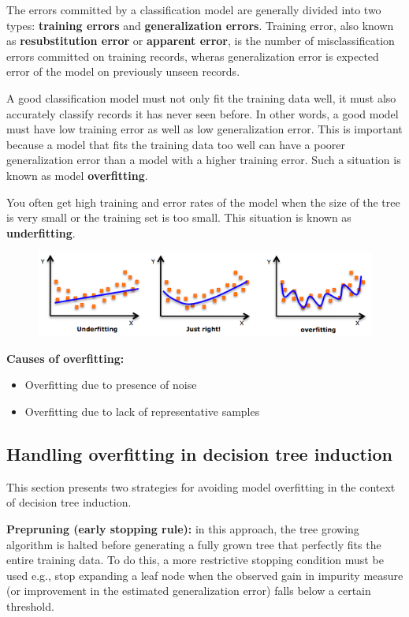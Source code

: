 		The errors committed by a classification model are generally divided into
		two types: {\bf training errors} and {\bf generalization errors}.
		Training error, also known as {\bf resubstitution error} or {\bf apparent error}, 
		is the number of misclassification errors committed on training records, wheras
		generalization error is expected error of the model on previously unseen records. 

		A good classification model must not only fit the training data well, it must
		also accurately classify records it has never seen before. In other words, 
		a good model must have low training error as well as low generalization error. 
		This is important because a model that fits the training data too well can 
		have a poorer generalization error than a model with a higher training error.
		Such a situation is known as model {\bf overfitting}.

		You often get high training and error rates of the model when the size of the
		tree is very small or the training set is too small. This situation is known 
		as {\bf underfitting}.

		\begin{figure}[H]
			\centering
			\includegraphics[width=\textwidth]{pics/fitting.png}
		\end{figure}

		{\bf Causes of overfitting:}
		\begin{itemize}
			\item Overfitting due to presence of noise
			\item Overfitting due to lack of representative samples
		\end{itemize}

		\subsection{Handling overfitting in decision tree induction}

		This section presents two strategies for avoiding model overfitting 
		in the context of decision tree induction. 

		{\bf Prepruning (early stopping rule):} in this approach, the tree growing
		algorithm is halted before generating a fully grown tree that perfectly
		fits the entire training data. To do this, a more restrictive stopping condition
		must be used e.g., stop expanding a leaf node when the observed gain in
		impurity measure (or improvement in the estimated generalization error) falls
		below a certain threshold. 

